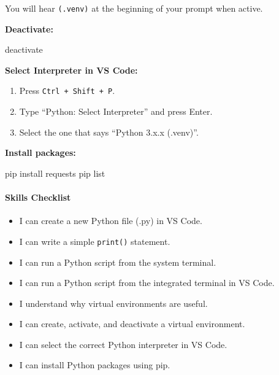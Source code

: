 \documentclass[
  justified,
  openright,
]{tufte-book}
\let\subsection\paragraph
\let\paragraph\paragraph
\newenvironment{Shaded}{%
  \begin{mdframed}[style=TufteCode]%
}{%
  \end{mdframed}%
}
\let\subsection\paragraph
\let\paragraph\paragraph
\providecommand{\tightlist}{%
  \setlength{\itemsep}{0pt}\setlength{\parskip}{0pt}}
\begin{document}
You will hear \texttt{(.venv)} at the beginning of your prompt when
active.

\textbf{Deactivate:}

\begin{Shaded}
\begin{Highlighting}[]
deactivate
\end{Highlighting}
\end{Shaded}

\textbf{Select Interpreter in VS Code:}

\begin{enumerate}
\def\labelenumi{\arabic{enumi}.}
\tightlist
\item
  Press \texttt{Ctrl\ +\ Shift\ +\ P}.
\item
  Type ``Python: Select Interpreter'' and press Enter.
\item
  Select the one that says ``Python 3.x.x (.venv)''.
\end{enumerate}

\textbf{Install packages:}

\begin{Shaded}
\begin{Highlighting}[]
pip install requests
pip list
\end{Highlighting}
\end{Shaded}

\subsection{Skills Checklist}\label{skills-checklist-3}

\begin{itemize}
\tightlist
\item[$\square$]
  I can create a new Python file (.py) in VS Code.
\item[$\square$]
  I can write a simple \texttt{print()} statement.
\item[$\square$]
  I can run a Python script from the system terminal.
\item[$\square$]
  I can run a Python script from the integrated terminal in VS Code.
\item[$\square$]
  I understand why virtual environments are useful.
\item[$\square$]
  I can create, activate, and deactivate a virtual environment.
\item[$\square$]
  I can select the correct Python interpreter in VS Code.
\item[$\square$]
  I can install Python packages using pip.
\end{itemize}
\end{document}
